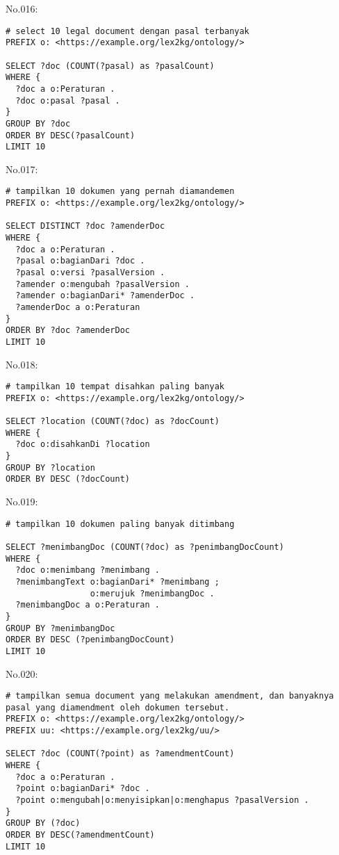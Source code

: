 \noindent No.016:
\begin{lstlisting}
# select 10 legal document dengan pasal terbanyak
PREFIX o: <https://example.org/lex2kg/ontology/>

SELECT ?doc (COUNT(?pasal) as ?pasalCount)
WHERE {
  ?doc a o:Peraturan .
  ?doc o:pasal ?pasal .
}
GROUP BY ?doc
ORDER BY DESC(?pasalCount)
LIMIT 10

\end{lstlisting}


\noindent No.017:
\begin{lstlisting}
# tampilkan 10 dokumen yang pernah diamandemen
PREFIX o: <https://example.org/lex2kg/ontology/>

SELECT DISTINCT ?doc ?amenderDoc
WHERE {
  ?doc a o:Peraturan .
  ?pasal o:bagianDari ?doc .
  ?pasal o:versi ?pasalVersion .
  ?amender o:mengubah ?pasalVersion .
  ?amender o:bagianDari* ?amenderDoc .
  ?amenderDoc a o:Peraturan
}
ORDER BY ?doc ?amenderDoc
LIMIT 10
\end{lstlisting}


\noindent No.018:
\begin{lstlisting}
# tampilkan 10 tempat disahkan paling banyak
PREFIX o: <https://example.org/lex2kg/ontology/>

SELECT ?location (COUNT(?doc) as ?docCount)
WHERE {
  ?doc o:disahkanDi ?location
}
GROUP BY ?location
ORDER BY DESC (?docCount)
\end{lstlisting}


\noindent No.019:
\begin{lstlisting}
# tampilkan 10 dokumen paling banyak ditimbang

SELECT ?menimbangDoc (COUNT(?doc) as ?penimbangDocCount)
WHERE {
  ?doc o:menimbang ?menimbang .
  ?menimbangText o:bagianDari* ?menimbang ;
                 o:merujuk ?menimbangDoc .
  ?menimbangDoc a o:Peraturan .
}
GROUP BY ?menimbangDoc
ORDER BY DESC (?penimbangDocCount)
LIMIT 10

\end{lstlisting}


\noindent No.020:
\begin{lstlisting}
# tampilkan semua document yang melakukan amendment, dan banyaknya pasal yang diamendment oleh dokumen tersebut.
PREFIX o: <https://example.org/lex2kg/ontology/>
PREFIX uu: <https://example.org/lex2kg/uu/>

SELECT ?doc (COUNT(?point) as ?amendmentCount)
WHERE {
  ?doc a o:Peraturan .
  ?point o:bagianDari* ?doc .
  ?point o:mengubah|o:menyisipkan|o:menghapus ?pasalVersion .
}
GROUP BY (?doc)
ORDER BY DESC(?amendmentCount)
LIMIT 10
\end{lstlisting}


